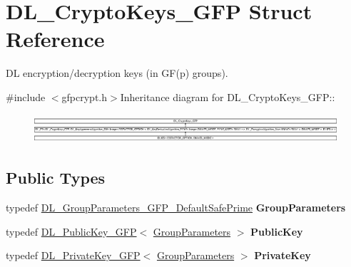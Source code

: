 \hypertarget{struct_d_l___crypto_keys___g_f_p}{
\section{DL\_\-CryptoKeys\_\-GFP Struct Reference}
\label{struct_d_l___crypto_keys___g_f_p}
}


DL encryption/decryption keys (in GF(p) groups).  


{\ttfamily \#include $<$gfpcrypt.h$>$}Inheritance diagram for DL\_\-CryptoKeys\_\-GFP::\begin{figure}[H]
\begin{center}
\leavevmode
\includegraphics[height=1.08387cm]{struct_d_l___crypto_keys___g_f_p}
\end{center}
\end{figure}
\subsection*{Public Types}
\begin{DoxyCompactItemize}
\item 
\hypertarget{struct_d_l___crypto_keys___g_f_p_ae775386f9d0dfc252bdd1b58dbb5a529}{
typedef \hyperlink{class_d_l___group_parameters___g_f_p___default_safe_prime}{DL\_\-GroupParameters\_\-GFP\_\-DefaultSafePrime} {\bfseries GroupParameters}}
\label{struct_d_l___crypto_keys___g_f_p_ae775386f9d0dfc252bdd1b58dbb5a529}

\item 
\hypertarget{struct_d_l___crypto_keys___g_f_p_a6675e22c646660d02ad3d01604031135}{
typedef \hyperlink{class_d_l___public_key___g_f_p}{DL\_\-PublicKey\_\-GFP}$<$ \hyperlink{class_d_l___group_parameters___g_f_p___default_safe_prime}{GroupParameters} $>$ {\bfseries PublicKey}}
\label{struct_d_l___crypto_keys___g_f_p_a6675e22c646660d02ad3d01604031135}

\item 
\hypertarget{struct_d_l___crypto_keys___g_f_p_ab9e7e2d594a87bf4a1777f23c721c22e}{
typedef \hyperlink{class_d_l___private_key___g_f_p}{DL\_\-PrivateKey\_\-GFP}$<$ \hyperlink{class_d_l___group_parameters___g_f_p___default_safe_prime}{GroupParameters} $>$ {\bfseries PrivateKey}}
\label{struct_d_l___crypto_keys___g_f_p_ab9e7e2d594a87bf4a1777f23c721c22e}

\end{DoxyCompactItemize}


